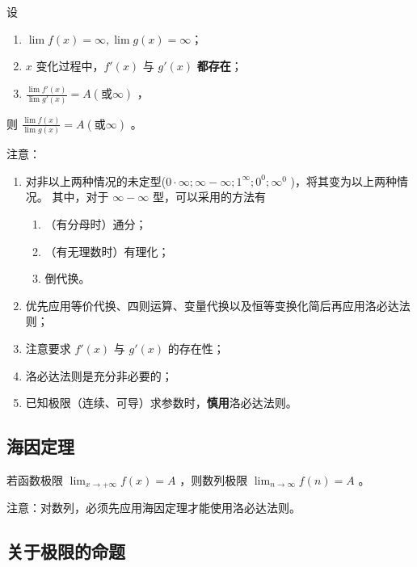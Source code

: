 \begin{Theo}

    设
    \begin{enumerate}
        \item $ \lim f(x)=\infty,\lim g(x)=\infty $；
        \item $ x $ 变化过程中，$ f'(x) $ 与 $ g'(x) $ \textbf{都存在}；
        \item $ \frac{\lim f'(x)}{\lim g'(x)}=A(\textrm{或}\infty) $ ，
    \end{enumerate}
    则 $ \frac{\lim f(x)}{\lim g(x)}=A(\textrm{或}\infty) $ 。
\end{Theo}

注意：
\begin{enumerate}
    \item 对非以上两种情况的未定型($ 0\cdot\infty;\infty-\infty;1^{\infty};0^0;\infty^{0} $ )，将其变为以上两种情况。
    其中，对于 $ \infty-\infty $ 型，可以采用的方法有
    \begin{enumerate}
        \item （有分母时）通分；
        \item （有无理数时）有理化；
        \item 倒代换。
    \end{enumerate}
    \item 优先应用等价代换、四则运算、变量代换以及恒等变换化简后再应用洛必达法则；
    \item 注意要求 $ f'(x) $ 与 $ g'(x) $ 的存在性；
    \item 洛必达法则是充分非必要的；
    \item 已知极限（连续、可导）求参数时，\textbf{慎用}洛必达法则。
\end{enumerate}

\subsection{海因定理}

\begin{Theo}[海因定理]

    若函数极限 $ \displaystyle\lim_{x\rightarrow+\infty}f(x)=A $ ，则数列极限 $ \displaystyle\lim_{n\rightarrow\infty}f(n)=A $ 。
\end{Theo}

注意：对数列，必须先应用海因定理才能使用洛必达法则。

\subsection{关于极限的命题}

